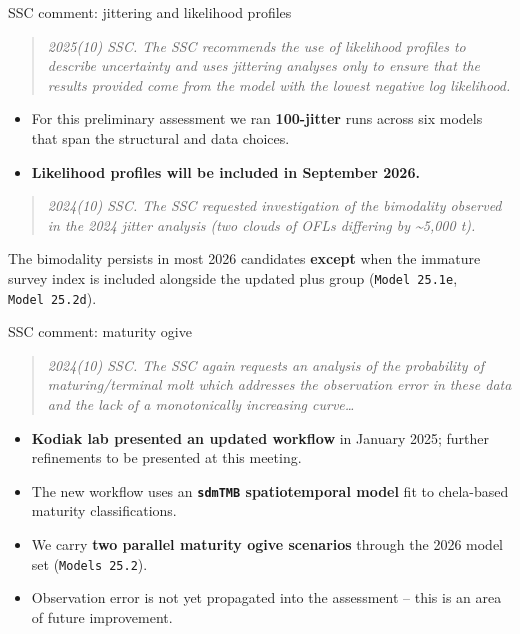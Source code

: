 \documentclass[
  10pt,
  ignorenonframetext,
  aspectratio=169,
]{beamer}
\providecommand{\tightlist}{%
  \setlength{\itemsep}{0pt}\setlength{\parskip}{0pt}}
\begin{document}
\begin{frame}[fragile]{SSC comment: jittering and likelihood profiles}
\label{ssc-comment-jittering-and-likelihood-profiles}
\begin{quote}
\emph{2025(10) SSC. The SSC recommends the use of likelihood profiles to
describe uncertainty and uses jittering analyses only to ensure that the
results provided come from the model with the lowest negative log
likelihood.}
\end{quote}

\medskip

\begin{itemize}
\tightlist
\item
  For this preliminary assessment we ran \textbf{100-jitter} runs across
  six models that span the structural and data choices.
\item
  \textbf{Likelihood profiles will be included in September 2026.}
\end{itemize}

\medskip

\begin{quote}
\emph{2024(10) SSC. The SSC requested investigation of the bimodality
observed in the 2024 jitter analysis (two clouds of OFLs differing by
\textasciitilde5,000 t).}
\end{quote}

The bimodality persists in most 2026 candidates \textbf{except} when the
immature survey index is included alongside the updated plus group
(\texttt{Model\ 25.1e}, \texttt{Model\ 25.2d}).
\end{frame}

\begin{frame}[fragile]{SSC comment: maturity ogive}
\label{ssc-comment-maturity-ogive}
\begin{quote}
\emph{2024(10) SSC. The SSC again requests an analysis of the
probability of maturing/terminal molt which addresses the observation
error in these data and the lack of a monotonically increasing
curve\ldots{}}
\end{quote}

\medskip

\begin{itemize}
\tightlist
\item
  \textbf{Kodiak lab presented an updated workflow} in January 2025;
  further refinements to be presented at this meeting.
\item
  The new workflow uses an \textbf{\texttt{sdmTMB} spatiotemporal model}
  fit to chela-based maturity classifications.
\item
  We carry \textbf{two parallel maturity ogive scenarios} through the
  2026 model set (\texttt{Models\ 25.2}).
\item
  Observation error is not yet propagated into the assessment -- this is
  an area of future improvement.
\end{itemize}
\end{frame}
\end{document}
